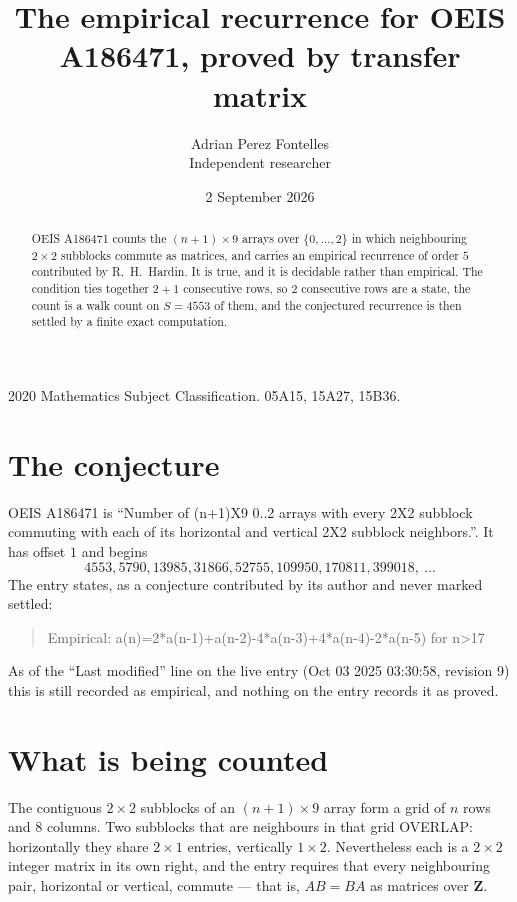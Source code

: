 \documentclass[11pt,a4paper]{article}
\title{The empirical recurrence for OEIS A186471, proved by transfer matrix}
\author{Adrian Perez Fontelles\\ \small Independent researcher}
\date{2 September 2026}
\theoremstyle{plain}
\theoremstyle{definition}
\begin{document}
\maketitle

\begin{abstract}
OEIS A186471 counts the $(n+1)\times9$ arrays over $\{0,\dots,2\}$ in which
neighbouring $2\times2$ subblocks commute as matrices, and carries an empirical
recurrence
of order $5$ contributed by R.~H.~Hardin. It is true, and it is decidable rather than
empirical. The condition ties together $2+1$ consecutive rows, so $2$ consecutive rows are
a state, the count is a walk count on $S=4553$ of them, and the conjectured recurrence is then
settled by a finite exact computation.
\end{abstract}

\noindent\small 2020 Mathematics Subject Classification. 05A15, 15A27, 15B36.\normalsize

\section{The conjecture}

OEIS A186471 is ``Number of (n+1)X9 0..2 arrays with every 2X2 subblock commuting with each of its horizontal and vertical 2X2 subblock neighbors.''. It has offset $1$ and begins
\[
4553, 5790, 13985, 31866, 52755, 109950, 170811, 399018,\ \dots
\]
The entry states, as a conjecture contributed by its author and never marked settled:
\begin{quote}
Empirical: a(n)=2*a(n-1)+a(n-2)-4*a(n-3)+4*a(n-4)-2*a(n-5) for n>17
\end{quote}
As of the ``Last modified'' line on the live entry (Oct 03 2025 03:30:58, revision 9) this is still
recorded as empirical, and nothing on the entry records it as proved.

\section{What is being counted}

The contiguous $2\times2$ subblocks of an $(n+1)\times9$ array form a grid of $n$
rows and $8$ columns. Two subblocks that are neighbours in that
grid OVERLAP: horizontally they share $2\times1$ entries, vertically
$1\times2$. Nevertheless each is a $2\times2$ integer matrix in its own right, and
the entry requires that every neighbouring pair, horizontal or vertical, commute --- that is,
$AB=BA$ as matrices over $\mathbf{Z}$.
\end{document}
